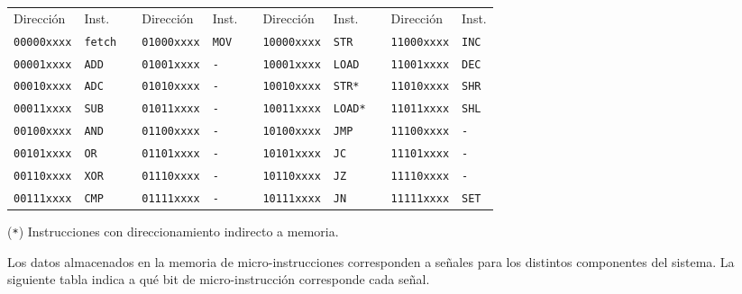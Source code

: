 \documentclass[a4paper,11pt]{article}
\begin{document}
\small
\begin{center}
\begin{tabular}[t]{l|lcl|lcl|lcl|l}
Dirección          & Inst.         & & Dirección          & Inst.         & & Dirección          & Inst.         & & Dirección          & Inst.         \\  
\cline{1-2} \cline{4-5} \cline{7-8} \cline{10-11}
\texttt{00000xxxx} & \texttt{fetch}& & \texttt{01000xxxx} & \texttt{MOV}  & & \texttt{10000xxxx} & \texttt{STR}  & & \texttt{11000xxxx} & \texttt{INC}  \\
\texttt{00001xxxx} & \texttt{ADD}  & & \texttt{01001xxxx} & \texttt{-}    & & \texttt{10001xxxx} & \texttt{LOAD} & & \texttt{11001xxxx} & \texttt{DEC}  \\
\texttt{00010xxxx} & \texttt{ADC}  & & \texttt{01010xxxx} & \texttt{-}    & & \texttt{10010xxxx} & \texttt{STR*} & & \texttt{11010xxxx} & \texttt{SHR}  \\
\texttt{00011xxxx} & \texttt{SUB}  & & \texttt{01011xxxx} & \texttt{-}    & & \texttt{10011xxxx} & \texttt{LOAD*}& & \texttt{11011xxxx} & \texttt{SHL}  \\
\texttt{00100xxxx} & \texttt{AND}  & & \texttt{01100xxxx} & \texttt{-}    & & \texttt{10100xxxx} & \texttt{JMP}  & & \texttt{11100xxxx} & \texttt{-}    \\
\texttt{00101xxxx} & \texttt{OR}   & & \texttt{01101xxxx} & \texttt{-}    & & \texttt{10101xxxx} & \texttt{JC}   & & \texttt{11101xxxx} & \texttt{-}    \\
\texttt{00110xxxx} & \texttt{XOR}  & & \texttt{01110xxxx} & \texttt{-}    & & \texttt{10110xxxx} & \texttt{JZ}   & & \texttt{11110xxxx} & \texttt{-}    \\
\texttt{00111xxxx} & \texttt{CMP}  & & \texttt{01111xxxx} & \texttt{-}    & & \texttt{10111xxxx} & \texttt{JN}   & & \texttt{11111xxxx} & \texttt{SET}  \\
\end{tabular}
\end{center}
(\texttt{*}) Instrucciones con direccionamiento indirecto a memoria.
\normalsize

\bigskip

Los datos almacenados en la memoria de micro-instrucciones corresponden a señales para los distintos componentes del sistema.
La siguiente tabla indica a qué bit de micro-instrucción corresponde cada señal.
\end{document}
